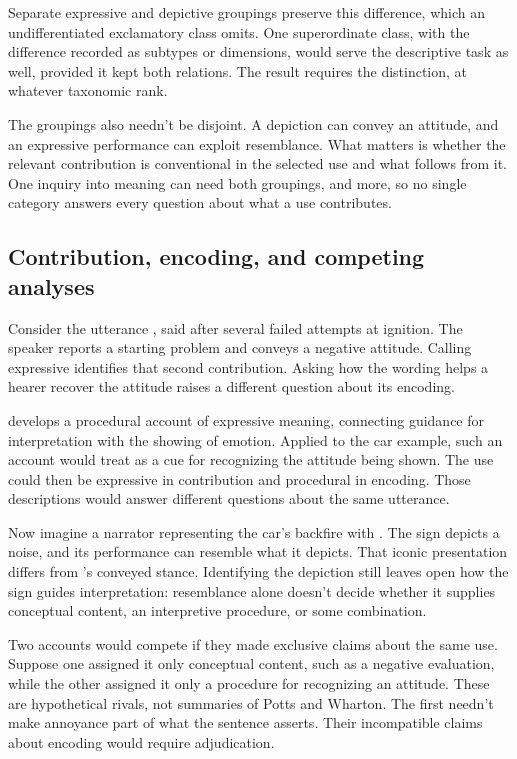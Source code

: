 \documentclass[12pt]{article}
\begin{document}
Separate expressive and depictive groupings preserve this difference, which
an undifferentiated exclamatory class omits. One superordinate class, with
the difference recorded as subtypes or dimensions, would serve the
descriptive task as well, provided it kept both relations. The result
requires the distinction, at whatever taxonomic rank.

The groupings also needn't be disjoint. A depiction can convey an attitude,
and an expressive performance can exploit resemblance. What matters is
whether the relevant contribution is conventional in the selected use and
what follows from it. One inquiry into meaning can need both groupings,
and more, so no single category answers every question about what a use
contributes.

\subsection{Contribution, encoding, and competing analyses}\label{sec:encoding}

Consider the utterance ,
said after several failed attempts at ignition. The speaker reports a
starting problem and conveys a negative attitude. Calling 
expressive identifies that second contribution. Asking how the wording
helps a hearer recover the attitude raises a different question about
its encoding.

\textcite{wharton2016expressives} develops a procedural account of expressive
meaning, connecting guidance for interpretation with the showing of emotion.
Applied to the car example, such an account would treat 
as a cue for recognizing the attitude being shown. The use could then
be expressive in contribution and procedural in encoding. Those descriptions
would answer different questions about the same utterance.

Now imagine a narrator representing the car's backfire with .
The sign depicts a noise, and its performance can resemble what it
depicts. That iconic presentation differs from 's conveyed
stance. Identifying the depiction still leaves open how the sign guides
interpretation: resemblance alone doesn't decide whether it supplies
conceptual content, an interpretive procedure, or some combination.

Two accounts would compete if they made exclusive claims
about the same  use. Suppose one assigned it only
conceptual content, such as a negative evaluation, while the other
assigned it only a procedure for recognizing an attitude. These are
hypothetical rivals, not summaries of Potts and Wharton. The first
needn't make annoyance part of what the sentence asserts. Their
incompatible claims about encoding would require adjudication.
\end{document}

